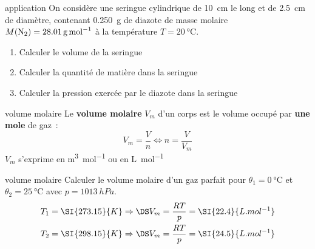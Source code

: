 \documentclass[../main/main.tex]{subfiles}
\begin{document}
\begin{exem}[label=exem:gp, sidebyside]{application}
    On considère une seringue cylindrique de \SI{10}{cm} le long et de
    \SI{2.5}{cm} de diamètre, contenant \SI{0.250}{g} de diazote de masse
    molaire $M({\rm N}_2) = \SI{28.01}{g.mol^{-1}}$ à la
    température $T = \SI{20}{\degreeCelsius}$.
    \begin{enumerate}
        \item Calculer le volume de la seringue
        \item Calculer la quantité de matière dans la seringue
        \item Calculer la pression exercée par le diazote dans la seringue
    \end{enumerate}
    \tcblower
\end{exem}
\begin{tcbraster}[raster columns=2, raster equal height=rows]
    \begin{defi}[label=def:volmol]{volume molaire}
        Le \textbf{volume molaire} $V_m$ d'un corps est le volume occupé par
        \textbf{une mole} de gaz~:
        \[\boxed{V_m = \frac{V}{n}} \Leftrightarrow n = \frac{V}{V_m}\]
        $V_m$ s'exprime en \si{m^3.mol^{-1}} ou en \si{L.mol^{-1}}
    \end{defi}
    \begin{exem}[label=exem:volmol]{volume molaire}
        Calculer le volume molaire d'un gaz parfait pour $\theta_1 =
        \SI{0}{\degreeCelsius}$ et $\theta_2 = \SI{25}{\degreeCelsius}$ avec $p
        = \SI{1013}{hPa}$.
        \tcblower
        \begin{gather*}
           T_1 = \SI{273.15}{K} \Rightarrow \DS V_m = \frac{RT}{p} =
                \SI{22.4}{L.mol^{-1}} \\
           T_2 = \SI{298.15}{K} \Rightarrow \DS V_m = \frac{RT}{p} =
                \SI{24.5}{L.mol^{-1}}
        \end{gather*}
    \end{exem}
\end{tcbraster}
\end{document}
